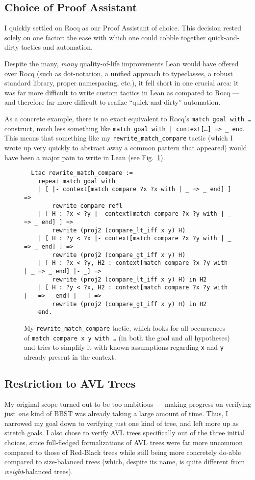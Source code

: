 \documentclass[acmsmall, authorversion, nonacm, overload]{acmart}
\begin{document}
\subsection{Choice of Proof Assistant}
I quickly settled on Rocq as our Proof Assistant of choice.
This decision rested solely on one factor: the ease with which one could cobble together
quick-and-dirty tactics and automation.

Despite the many, \emph{many} quality-of-life improvements Lean would have offered over Rocq
(such as dot-notation, a unified approach to typeclasses, a robust standard library,
proper namespacing, etc.), it fell short in one crucial area:
it was far more difficult to write custom tactics in Lean as compared to Rocq --- and therefore far more
difficult to realize ``quick-and-dirty'' automation.

As a concrete example, there is no exact equivalent to Rocq's \texttt{match goal with \dots} construct,
much less something like \texttt{match goal with | context[\dots] => _ end}.
This means that something like my \texttt{rewrite_match_compare} tactic (which I wrote up very quickly to
abstract away a common pattern that appeared) would have been a major pain to write in Lean
(see Fig.\ \ref{fig:rewrite_match_compare}).

\begin{figure}[h!]
\begin{verbatim}
  Ltac rewrite_match_compare :=
    repeat match goal with
    | [ |- context[match compare ?x ?x with | _ => _ end] ] =>
        rewrite compare_refl
    | [ H : ?x < ?y |- context[match compare ?x ?y with | _ => _ end] ] =>
        rewrite (proj2 (compare_lt_iff x y) H)
    | [ H : ?y < ?x |- context[match compare ?x ?y with | _ => _ end] ] =>
        rewrite (proj2 (compare_gt_iff x y) H)
    | [ H : ?x < ?y, H2 : context[match compare ?x ?y with | _ => _ end] |- _] =>
        rewrite (proj2 (compare_lt_iff x y) H) in H2
    | [ H : ?y < ?x, H2 : context[match compare ?x ?y with | _ => _ end] |- _] =>
        rewrite (proj2 (compare_gt_iff x y) H) in H2
    end.
\end{verbatim}
\caption{My \texttt{rewrite_match_compare} tactic, which looks for all occurrences of
  \texttt{match compare x y with \dots} (in both the goal and all hypotheses)
  and tries to simplify it with known assumptions regarding \texttt{x} and \texttt{y} already present in the context.}%
\label{fig:rewrite_match_compare}
\end{figure}
\subsection{Restriction to AVL Trees}
My original scope turned out to be too ambitious --- making progress on verifying just \emph{one}
kind of BBST was already taking a large amount of time.
Thus, I narrowed my goal down to verifying just one kind of tree, and left more up as stretch goals.
I also chose to verify AVL trees specifically out of the three initial choices,
since full-fledged formalizations of AVL trees were far more uncommon compared to those of Red-Black trees
while still being more concretely do-able compared to size-balanced trees (which, despite its name, is
quite different from \emph{weight}-balanced trees).
\end{document}
